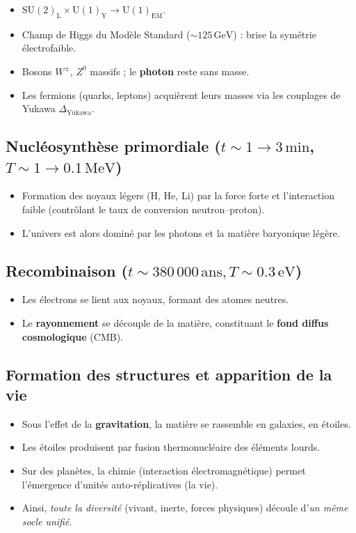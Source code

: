 \documentclass[12pt]{article}
\begin{document}
\begin{itemize}
    \item \(\mathrm{SU}(2)_\mathrm{L}\times \mathrm{U}(1)_\mathrm{Y} \to \mathrm{U}(1)_\mathrm{EM}\).  
    \item Champ de Higgs du Mod\`ele Standard (\(\sim 125\,\mathrm{GeV}\)) : 
    brise la sym\'etrie \'electrofaible.  
    \item Bosons $W^\pm$, $Z^0$ massifs ; le \textbf{photon} reste sans masse.  
    \item Les fermions (quarks, leptons) acqui\`erent leurs masses 
          via les couplages de Yukawa \(\Delta_{\text{Yukawa}}\).
\end{itemize}

\subsection{Nucl\'eosynth\`ese primordiale (\(t \sim 1 \to 3\,\text{min}\), \(T \sim 1 \to 0.1\,\mathrm{MeV}\))}

\begin{itemize}
    \item Formation des noyaux l\'egers (H, He, Li) par la force forte et l'interaction faible 
          (contr\^olant le taux de conversion neutron--proton).  
    \item L'univers est alors domin\'e par les photons et la mati\`ere baryonique l\'eg\`ere.
\end{itemize}

\subsection{Recombinaison (\(t \sim 380\,000\,\mathrm{ans}, T \sim 0.3\,\mathrm{eV}\))}

\begin{itemize}
    \item Les \'electrons se lient aux noyaux, formant des atomes neutres.  
    \item Le \textbf{rayonnement} se d\'ecouple de la mati\`ere, constituant le \textbf{fond diffus cosmologique} (CMB).  
\end{itemize}

\subsection{Formation des structures et apparition de la vie}

\begin{itemize}
    \item Sous l'effet de la \textbf{gravitation}, la mati\`ere se rassemble en galaxies, en \'etoiles.  
    \item Les \'etoiles produisent par fusion thermonucl\'eaire des \'el\'ements lourds.  
    \item Sur des plan\`etes, la chimie (interaction \'electromagn\'etique) permet l'\'emergence 
          d'unit\'es auto-r\'epli\-catives (la vie).  
    \item Ainsi, \emph{toute la diversit\'e} (vivant, inerte, forces physiques) 
          d\'ecoule d'\emph{un m\^eme socle unifi\'e}.
\end{itemize}
\end{document}

